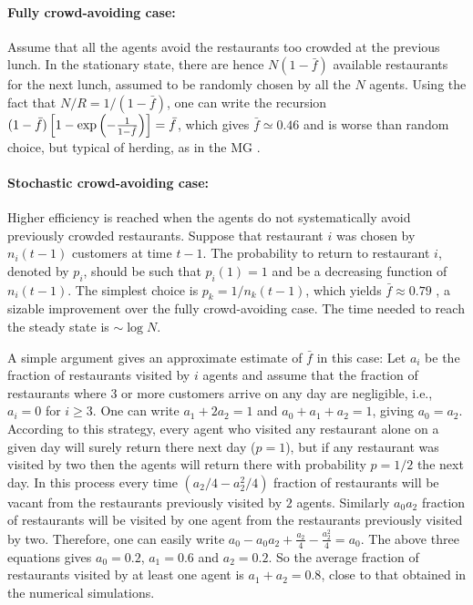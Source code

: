 \documentclass[aps,twocolumn,nofootinbib,sortedaddress,reprint]{revtex4-1}
\begin{document}
\paragraph*{Fully crowd-avoiding case:}
 Assume that all the agents avoid the restaurants too crowded at the previous lunch. In the stationary state, there are hence
 $N(1-\bar f)$ available restaurants for the next lunch, assumed to be randomly chosen by all the $N$
 agents. Using the fact that $N/R=1/{(1-\bar f)}$, one can write the recursion
 $(1-\bar {f})\left[1-{\rm exp}\left(-\frac{1}{1-\bar
     {f}}\right)\right]=\bar {f}$, which gives $\bar f\simeq 0.46$ and is worse than random choice, but typical of herding, as in the MG \cite{kpr-njp,kpr-proc}.

\paragraph*{Stochastic crowd-avoiding case:}
Higher efficiency is reached when the agents do not systematically avoid previously crowded restaurants.
 Suppose that restaurant $i$ was chosen by $n_i(t-1)$ customers at time $t-1$.  The probability to return to restaurant $i$, denoted by $p_i$, should be such that $p_i(1)=1$ and be a decreasing function of $n_i(t-1)$. The simplest choice is $p_k=1/n_k(t-1)$, which yields $\bar{f}\approx 0.79$
\cite{kpr-njp}, a sizable improvement over the fully crowd-avoiding case. The time needed to reach the steady state is
$\sim \log N$.

A simple argument gives an approximate estimate of $\bar{f}$ in this case:
Let $a_i$ be the fraction of restaurants visited by $i$
agents and assume that the fraction of restaurants where $3$ or more
customers arrive on any day are negligible, i.e., $a_i=0$ for $i\geq 3$.
One can write $a_1+2a_2 = 1$ and $a_0+a_1+a_2 = 1$, giving $a_0=a_2$.
According to this strategy, every agent who visited any restaurant
alone on a given day will surely return there next day ($p=1$), but if
any restaurant was visited by two then the agents will return there
with probability $p=1/2$ the next day. In this process every time
$(a_2/4-a_2^2/4)$ fraction of restaurants will be vacant from the
restaurants previously visited by $2$ agents.  Similarly $a_0a_2$
fraction of restaurants will be visited by one agent from the
restaurants previously visited by two. Therefore, one can easily write
$a_0-a_0a_2+ \frac{a_2}{4}-\frac{a_2^2}{4}=a_0$.  The above three
equations gives $a_0=0.2$, $a_1=0.6$ and $a_2=0.2$.  So the average
fraction of restaurants visited by at least one agent is
$a_1+a_2=0.8$, close to that obtained in the numerical simulations.
\end{document}

